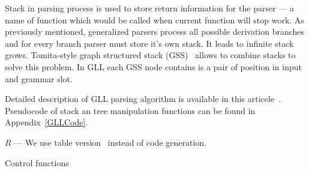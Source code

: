 Stack in parsing process is used to store return information for the parser --- a name of function which would be called when current function will stop work. 
As previously mentioned, generalized parsers process all possible derivation branches and for every branch parser must store it's own stack. It leads to infinite stack grows.  
Tomita-style graph structured stack (GSS)~\cite{Tomita} allows to combine stacks to solve this problem.
In GLL each GSS node contains is a pair of position in input and grammar slot. 

Detailed description of GLL parsing algorithm is available in this articele~\cite{GLL}. Pseudocode of stack an tree manipulation functions can be found in Appendix~\ref{GLLCode}.

$R$ ---   
We use table version~\cite{TableGLL} instead of code generation.

\begin{algorithm}[h]
\begin{algorithmic}[1]
\caption{Control functions}
\label{mainFunctions}
  \Else
  \EndIf
\EndFunction

       \Else 
       \EndIf
       \EndIf
  \EndCase
       \EndFor
  \EndCase
  \EndCase
  \EndCase
  \EndSwitch
\EndFunction

      \Else
      \EndIf
  \EndWhile
\EndFunction

\end{algorithmic}
\end{algorithm}

